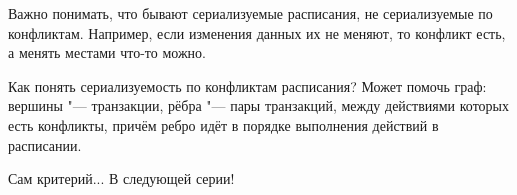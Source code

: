 Важно понимать, что бывают сериализуемые расписания, не сериализуемые по конфликтам.
Например, если изменения данных их не меняют, то конфликт есть, а менять местами что-то можно.

Как понять сериализуемость по конфликтам расписания?
Может помочь граф: вершины "--- транзакции, рёбра "--- пары транзакций, между действиями которых есть конфликты,
причём ребро идёт в порядке выполнения действий в расписании.

Сам критерий... В следующей серии!
